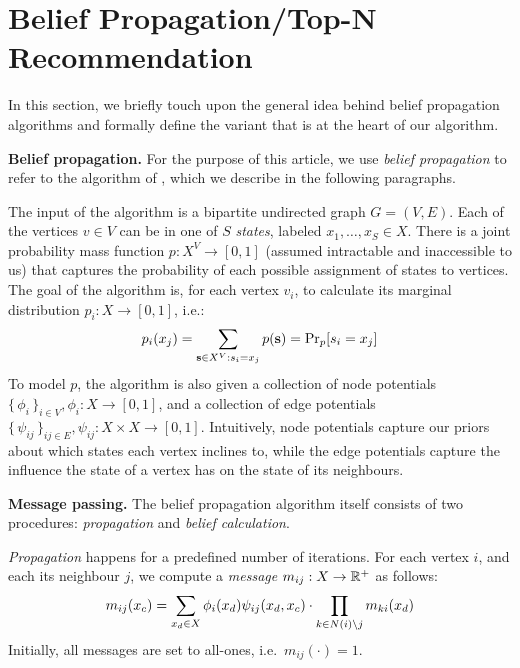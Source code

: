 \documentclass[letterpaper]{article}
\newcommand{\mypar}[1]{{\bf #1.}}
\begin{document}
\section{Belief Propagation/Top-N Recommendation}\label{sec:background}

In this section, we briefly touch upon the general idea behind belief
propagation algorithms and formally define the variant that is at the heart of
our algorithm.


\mypar{Belief propagation} For the purpose of this article, we use \emph{belief
propagation} to refer to the algorithm of \citet[Section
2.1]{top-n-recommendation}, which we describe in the following paragraphs.

The input of the algorithm is a bipartite undirected graph $G = (V, E)$. Each of the vertices $v\in V$ can
be in one of $S$ \emph{states}, labeled $x_1, \ldots, x_S \in X$. There is a
joint probability mass function $p: X^V \to [0, 1]$ (assumed intractable and
inaccessible to us) that captures the probability of each possible assignment of
states to vertices. The goal of the algorithm is, for each vertex $v_i$, to
calculate its marginal distribution $p_i: X \to [0, 1]$, i.e.:
%
$$p_i(x_j) = \sum_{\ves \in X^V: s_i = x_j} p(\ves) = \Pr_p[s_i = x_j]$$
%
To model $p$, the algorithm is also given a collection of node potentials
$\{\,\phi_i\,\}_{i \in V}, \phi_i: X \to [0, 1]$, and a collection of edge
potentials $\{\,\psi_{ij}\,\}_{ij \in E}, \psi_{ij}: X\times X \to [0, 1]$.
Intuitively, node potentials capture our priors about which states each vertex
inclines to, while the edge potentials capture the influence the state of a
vertex has on the state of its neighbours.

\mypar{Message passing} The belief propagation algorithm itself consists of two
procedures: \emph{propagation} and \emph{belief calculation}.

\emph{Propagation} happens for a predefined number of iterations. For each vertex $i$, and each its neighbour $j$, we compute a \emph{message} $m_{ij} : X \to \mathbb{R}^+$ as follows:
%
$$m_{ij}(x_c) = \sum_{x_d \in X} \phi_i(x_d)\psi_{ij}(x_d, x_c) \cdot \prod_{k \in N(i) \setminus j} m_{ki}(x_d)$$
%
Initially, all messages are set to all-ones, i.e.~$m_{ij}(\cdot) = 1$.
\end{document}
